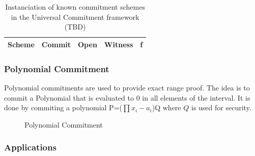 \documentclass[11pt]{llncs2e/llncs}
\begin{document}
\begin{table}
\begin{center}
 \begin{tabular}{ |c| c|c|c|c|}
  \hline
  Scheme & Commit & Open & Witness & f \\
  \hline
 \end{tabular}
 \end{center}
 \caption{Instanciation of known commitment schemes in the Universal Commitment framework (TBD)}
\end{table}

\subsubsection{Polynomial Commitment}
 
 Polynomial commitments are used to provide exact range proof. The idea is to commit a Polynomial that is evaluated to $0$ in all elements of the interval. It is done by commiting a polynomial P=($\prod x_i-a_i$)Q where $Q$ is used for security.
  
 \begin{figure}[h!] 
 
\caption{Polynomial Commitment \cite{Kate10}}
 \end{figure}
 
 \subsubsection{Applications}
 
\end{document}
